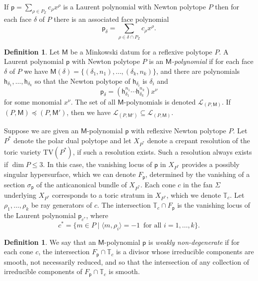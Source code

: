 \documentclass[10pt]{amsart}
\numberwithin{equation}{section}
\theoremstyle{plain}
\theoremstyle{definition}
\newtheorem{definition}[theorem]{Definition}
\theoremstyle{remark}
\begin{document}
If \(\mathsf{p}= \sum_{\rho \in P_\mathbb{Z}}c_\rho x^\rho\) is a Laurent polynomial with Newton polytope \(P\) then for each face \(\delta\) of \(P\) there is an associated face polynomial
\[
  \mathsf{p}_\delta = \sum_{\rho \in \delta \cap P_\mathbb{Z}} c_\rho x^\rho.
\]

\begin{definition}\label{definition:Mpol}
  Let \(\mathsf{M}\) be a Minkowski datum for a reflexive polytope \(P\). A Laurent polynomial \(\mathsf{p}\) with Newton polytope \(P\) is an \emph{\(\mathsf{M}\)-polynomial} if for each face \(\delta\) of \(P\) we have \(\mathsf{M}(\delta) = \{(\delta_1,n_1), \ldots, (\delta_k,n_k)\}\), and there are polynomials \(\mathsf{h}_{\delta_1},\dots, \mathsf{h}_{\delta_k}\) so that the Newton polytope of \(\mathsf{h}_{\delta_i}\) is \(\delta_i\) and
  \[
    \mathsf{p}_\delta = (\mathsf{h}_{\delta_1}^{n_1} \cdots \mathsf{h}_{\delta_k}^{n_k})x^\nu
  \]
  for some monomial \(x^\nu\). The set of all \(\mathsf{M}\)-polynomials is denoted \(\mathcal{L}_{(P,\mathsf{M})}\). If \((P,\mathsf{M}) \preceq (P,\mathsf{M}')\), then we have \(\mathcal{L}_{(P,\mathsf{M}')} \subseteq \mathcal{L}_{(P,\mathsf{M})}\).
\end{definition}


Suppose we are given an \(\mathsf{M}\)-polynomial \(\mathsf{p}\) with  reflexive Newton polytope \(P\). Let \(P^*\) denote the polar dual polytope and let \({X}_{P^*}\) denote a crepant resolution of the toric variety \(\mathrm{TV}(P^*)\), if such a resolution exists. Such a resolution always exists if \(\dim P \leq 3\). In this case, the vanishing locus of \(\mathsf{p}\) in \(X_{P^*}\) provides a possibly singular hypersurface, which we can denote \(F_\mathsf{p}\), determined by the vanishing of a section \(\sigma_\mathsf{p}\) of the anticanonical bundle of \(X_{P^*}\). Each cone \(c\) in the fan \(\Sigma\) underlying \(X_{P^*}\) corresponds to a toric stratum in \(X_{P^*}\), which we denote \(\mathbb{T}_c\). Let \(\rho_1, \ldots, \rho_k\) be ray generators of \(c\). The intersection \(\mathbb{T}_c \cap F_\mathsf{p}\) is the vanishing locus of the Laurent polynomial \(\mathsf{p}_{c^*}\), where
\[
  c^* = \{ m \in P \mid \langle m, \rho_i \rangle = -1 \, \text{ for all } i = 1, \ldots, k\}.
\]

\begin{definition}\label{definition:wnd}
  We say that an \(\mathsf{M}\)-polynomial \(\mathsf{p}\) is \emph{weakly non-degenerate} if for each cone \(c\), the intersection \(F_\mathsf{p}\cap \mathbb{T}_c\) is a divisor whose irreducible components are smooth, not necessarily reduced, and so that the intersection of any collection of irreducible components of \(F_\mathsf{p} \cap \mathbb{T}_c\) is smooth.
\end{definition}
\end{document}
